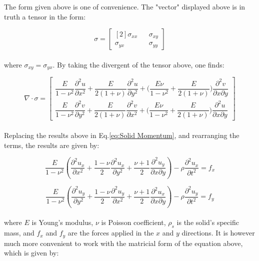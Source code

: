 \documentclass{article}
\begin{document}
The form given above is one of convenience. The "vector" displayed above is in truth a tensor in the form:

\begin{equation}
	\sigma =
	\begin{bmatrix}[2]
		\sigma_{xx} && \sigma_{xy} \\
		\sigma_{yx} && \sigma_{yy}
	\end{bmatrix}
\end{equation} \\

\noindent where $\sigma_{xy} = \sigma_{yx}$. By taking the divergent of the tensor above, one finds:

\begin{equation}
	\nabla \cdot \sigma =
	\begin{bmatrix}
		\dfrac{E}{1-\nu^2} \dfrac{\partial^2 u}{\partial x^2}
		+ \dfrac{E}{2(1+\nu)} \dfrac{\partial^2 u}{\partial y^2}
		+ \bigg(\dfrac{E \nu}{1-\nu^2} + \dfrac{E}{2(1+\nu)} \bigg) \dfrac{\partial^2 v}{\partial x \partial y} \\
		\dfrac{E}{1-\nu^2} \dfrac{\partial^2 v}{\partial y^2}
		+ \dfrac{E}{2(1+\nu)} \dfrac{\partial^2 v}{\partial x^2}
		+ \bigg(\dfrac{E \nu}{1-\nu^2} + \dfrac{E}{2(1+\nu)} \bigg) \dfrac{\partial^2 u}{\partial x \partial y}		
	\end{bmatrix}	
\end{equation} \\

Replacing the results above in Eq.\ref{eq:Solid Momentum}, and rearranging the terms, the results are given by:

\begin{equation}
	\frac{E}{1 - \nu^2} \left( \frac{\partial^2 u_x}{\partial x^2} + \frac{1 - \nu}{2} \frac{\partial^2 u_x}{\partial y^2} + \frac{\nu + 1}{2} \frac{\partial^2 u_y}{\partial x \partial y} \right)
	- \rho \frac{\partial^2 u_x}{\partial t^2} 
	= f_x
\end{equation}

\begin{equation}
	\frac{E}{1 - \nu^2} \left( \frac{\partial^2 u_y}{\partial y^2} + \frac{1 - \nu}{2} \frac{\partial^2 u_y}{\partial x^2} + \frac{\nu + 1}{2} \frac{\partial^2 u_x}{\partial x \partial y} \right)
	- \rho \frac{\partial^2 u_y}{\partial t^2}
	= f_y
\end{equation} \\

\noindent where $E$ is Young's modulus, $\nu$ is Poisson coefficient, $\rho_s$ is the solid's specific mass, and $f_x$ and $f_y$ are the forces applied in the $x$ and $y$ directions. It is however much more convenient to work with the matricial form of the equation above, which is given by:
\end{document}
